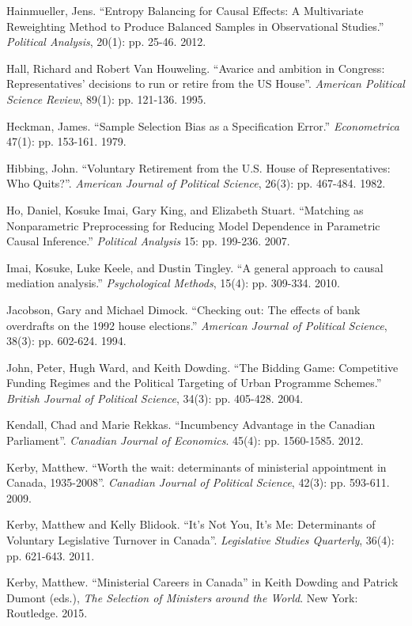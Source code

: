 \documentclass[letter,12pt]{article}
\begin{document}
\begin{hangparas}{.25in}{1}
Hainmueller, Jens. ``Entropy Balancing for Causal Effects: A Multivariate Reweighting Method to Produce Balanced Samples in Observational Studies.'' \textit{Political Analysis}, 20(1): pp. 25-46. 2012.

Hall, Richard and Robert Van Houweling. ``Avarice and ambition in Congress: Representatives' decisions to run or retire from the US House''. \textit{American Political Science Review}, 89(1): pp. 121-136. 1995.

Heckman, James. ``Sample Selection Bias as a Specification Error.'' \textit{Econometrica} 47(1): pp. 153-161. 1979.

Hibbing, John. ``Voluntary Retirement from the U.S. House of Representatives: Who Quits?''. \textit{American Journal of Political Science}, 26(3): pp. 467-484. 1982.

Ho, Daniel, Kosuke Imai, Gary King, and Elizabeth Stuart. ``Matching as Nonparametric Preprocessing for Reducing Model Dependence in Parametric Causal Inference.'' \textit{Political Analysis} 15: pp. 199-236. 2007.

Imai, Kosuke, Luke Keele, and Dustin Tingley. ``A general approach to causal mediation analysis.'' \textit{Psychological Methods}, 15(4): pp. 309-334. 2010.

Jacobson, Gary and Michael Dimock. ``Checking out: The effects of bank overdrafts on the 1992 house elections.'' \textit{American Journal of Political Science}, 38(3): pp. 602-624. 1994.

John, Peter, Hugh Ward, and Keith Dowding. ``The Bidding Game: Competitive Funding Regimes and the Political Targeting of Urban Programme Schemes.'' \textit{British Journal of Political Science}, 34(3): pp. 405-428. 2004.

Kendall, Chad and Marie Rekkas. ``Incumbency Advantage in the Canadian Parliament''. \textit{Canadian Journal of Economics}. 45(4): pp. 1560-1585. 2012.

Kerby, Matthew. ``Worth the wait: determinants of ministerial appointment in Canada, 1935-2008''.
\textit{Canadian Journal of Political Science}, 42(3): pp. 593-611. 2009.

Kerby, Matthew and Kelly Blidook. ``It's Not You, It's Me: Determinants of Voluntary Legislative Turnover in Canada''. \textit{Legislative Studies Quarterly}, 36(4): pp. 621-643. 2011.

Kerby, Matthew. ``Ministerial Careers in Canada'' in Keith Dowding and Patrick Dumont (eds.), \textit{The Selection of Ministers around the World}. New York: Routledge. 2015.


\end{hangparas}
\end{document}
